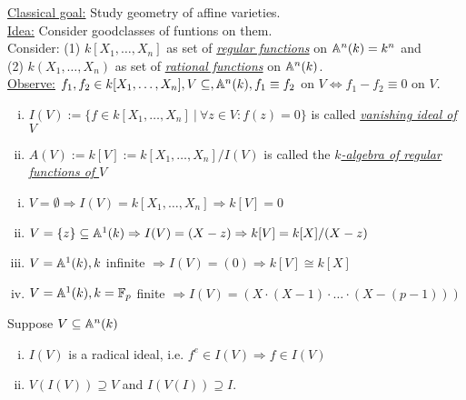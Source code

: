 \underline{Classical goal:} Study geometry of affine varieties.\\
\underline{Idea:} Consider \glqq good\grqq classes of funtions on them.\\
Consider: (1) $k[X_1, \dots, X_n]$ as set of \emph{\underline{regular functions}} on $\mathbb{A}^n(k)=k^n$ and\\
\vphantom{Consider: } (2) $k(X_1, \dots, X_n)$ as set of \emph{\underline{rational functions}} on $\mathbb{A}^n(k)$.\\
\underline{Observe:} $f_1, f_2 \in k[X_1, \dots, X_n], V \subseteq,  \mathbb{A}^n(k), f_1 \equiv f_2$ on $V \iff f_1-f_2 \equiv 0$ on $V$.

\begin{defi}
\begin{enumerate}[i)]
\item $I(V):=\{f \in k[X_1, \dots, X_n] \ | \ \forall z \in V: f(z)=0\}$ is called \emph{\underline{vanishing ideal of $V$}}
\item $A(V):=k[V]:=k[X_1, \dots, X_n]/I(V)$ is called the \emph{\underline{$k$-algebra of regular functions of $V$}}
\end{enumerate}
\end{defi}

\begin{Bsp}
\begin{enumerate}[i)]
\item $V=\emptyset \Rightarrow I(V) = k[X_1, \dots, X_n] \Rightarrow k[V]=0$
\item $V=\{z\} \subseteq \mathbb{A}^1(k) \Rightarrow I(V)=(X-z) \Rightarrow k[V]=k[X]/(X-z)$
\item $V=\mathbb{A}^1(k), k $ infinite $\Rightarrow I(V)=(0) \Rightarrow k[V]\cong k[X]$
\item $V=\mathbb{A}^1(k), k =\mathbb{F}_p$ finite $\Rightarrow I(V)=(X\cdot(X-1)\cdot \ldots \cdot (X-(p-1)))$
\end{enumerate}
\end{Bsp}

\begin{Bem}
Suppose $V \subseteq \mathbb{A}^n(k)$
\begin{enumerate}[i)]
\item $I(V)$ is a radical ideal, i.e. $f^e \in I(V) \Rightarrow f \in I(V)$
\item $V(I(V)) \supseteq V$ and $I(V(I)) \supseteq I$.
\end{enumerate}
\end{Bem}